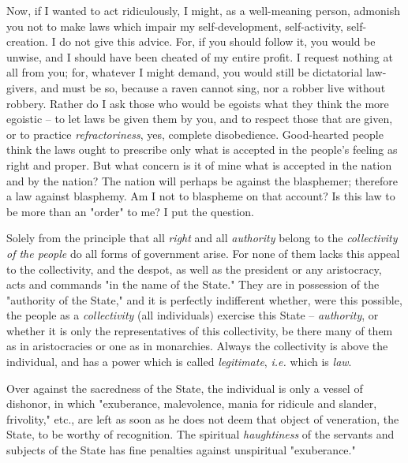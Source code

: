 \documentclass[a4paper]{book}
\begin{document}
Now, if I wanted to act ridiculously, I might, as a well-meaning person, 
admonish you not to make laws which impair my self-development, self-activity, 
self-creation. I do not give this advice. For, if you should follow it, you 
would be unwise, and I should have been cheated of my entire profit. I request 
nothing at all from you; for, whatever I might demand, you would still be 
dictatorial law-givers, and must be so, because a raven cannot sing, nor a 
robber live without robbery. Rather do I ask those who would be egoists what 
they think the more egoistic -- to let laws be given them by you, and to 
respect those that are given, or to practice \textit{refractoriness}, yes, 
complete disobedience. Good-hearted people think the laws ought to prescribe 
only what is accepted in the people's feeling as right and proper. But what 
concern is it of mine what is accepted in the nation and by the nation? The 
nation will perhaps be against the blasphemer; therefore a law against 
blasphemy. Am I not to blaspheme on that account? Is this law to be more than 
an "{}order"{} to me? I put the question.

Solely from the principle that all \textit{right} and all \textit{authority} 
belong to the \textit{collectivity of the people} do all forms of government 
arise. For none of them lacks this appeal to the collectivity, and the despot, 
as well as the president or any aristocracy, acts and commands "{}in the name 
of the State."{} They are in possession of the "{}authority of the State,"{} 
and it is perfectly indifferent whether, were this possible, the people as a 
\textit{collectivity} (all individuals) exercise this State -- 
\textit{authority}, or whether it is only the representatives of this 
collectivity, be there many of them as in aristocracies or one as in 
monarchies. Always the collectivity is above the individual, and has a power 
which is called \textit{legitimate}, \textit{i.e.} which is \textit{law}.

Over against the sacredness of the State, the individual is only a vessel of 
dishonor, in which "{}exuberance, malevolence, mania for ridicule and slander, 
frivolity,"{} etc., are left as soon as he does not deem that object of 
veneration, the State, to be worthy of recognition. The spiritual 
\textit{haughtiness} of the servants and subjects of the State has fine 
penalties against unspiritual "{}exuberance."{}
\end{document}
